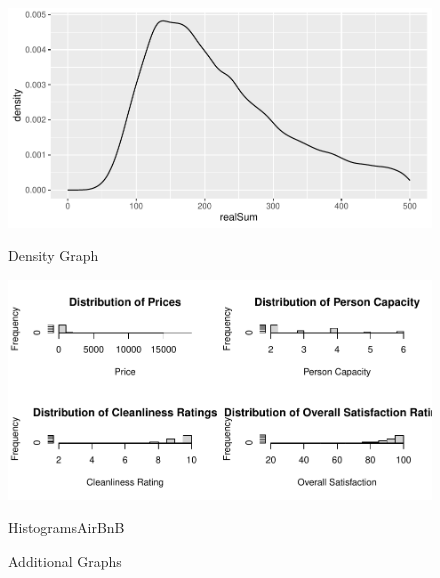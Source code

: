 \documentclass[12pt, letterpaper]{article}
\begin{document}
\begin{figure}[H]
  \vspace{0.05\textwidth}

  \begin{minipage}{0.45\textwidth}
    \includegraphics[width=\linewidth]{DensityGraph.pdf}
    \caption{Density Graph}
    \label{fig:DensityGraph}
  \end{minipage}
  \hspace{0.05\textwidth}
  \begin{minipage}{0.45\textwidth}
    \includegraphics[width=\linewidth]{HistogramsAirBnB.pdf}
    \caption{HistogramsAirBnB}
    \label{fig:HistogramsAirBnB}
  \end{minipage}

  \caption{Additional Graphs}
  \label{fig:additional_graphs_1}
\end{figure}
\end{document}
